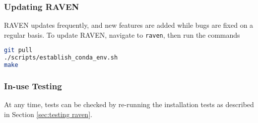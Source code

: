 \subsubsection{Updating RAVEN}
RAVEN updates frequently, and new features are added while bugs are fixed on a regular basis.  To update
RAVEN, navigate to \texttt{raven}, then run the commands
\begin{lstlisting}[language=bash]
git pull
./scripts/establish_conda_env.sh
make
\end{lstlisting}


\subsubsection{In-use Testing}

At any time, tests can be checked by re-running the installation tests as
described in Section \ref{sec:testing raven}.
